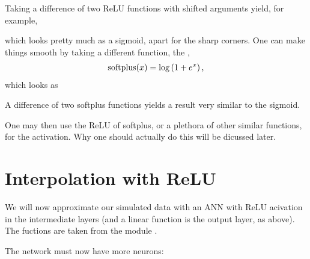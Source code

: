 \documentclass[letterpaper,10pt,english]{jupyterBook}
\begin{document}
\noindent{}

\sphinxAtStartPar
Taking a difference of two ReLU functions with shifted arguments yield, for example,

\noindent{}

\sphinxAtStartPar
which looks pretty much as a sigmoid, apart for the sharp corners. One can make things smooth by taking a different function, the ,
\begin{equation*}
\begin{split}
{\rm softplus}(x)=\log \left( 1+e^x \right ),
\end{split}
\end{equation*}
\sphinxAtStartPar
which looks as

\noindent{}

\sphinxAtStartPar
A difference of two softplus functions yields a result very similar to the sigmoid.

\noindent{}

\sphinxAtStartPar
One may then use the ReLU of softplus, or a plethora of other similar functions, for the activation. Why one should actually do this will be dicussed later.


\section{Interpolation with ReLU}
\label{\detokenize{docs/rectification:interpolation-with-relu}}
\sphinxAtStartPar
We will now approximate our simulated data with an ANN with ReLU acivation in the intermediate layers (and a linear function is the output layer, as above). The fuctions are taken from the module .

\begin{sphinxVerbatim}[commandchars=\\\{\}]
\end{sphinxVerbatim}

\sphinxAtStartPar
The network must now have more neurons:

\begin{sphinxVerbatim}[commandchars=\\\{\}]
\PYG{p}{[}\PYG{p}{]}                   
  
\end{sphinxVerbatim}
\end{document}
